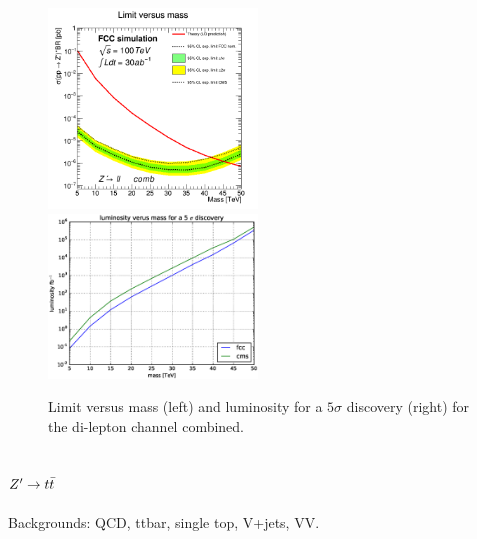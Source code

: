 \documentclass{cernrep}
\begin{document}
\begin{figure}[!htb]\centering
\includegraphics[width=0.495\textwidth]{Fig/lim_Zprime_ll_fcc_cms.png}
\includegraphics[width=0.495\textwidth]{Fig/DiscoveryPotential_ll.eps}
\caption{Limit versus mass (left) and luminosity for a $5\sigma$ discovery (right) for the
 di-lepton channel combined.}
\label{fig:zpll_lim}
\end{figure}

\clearpage
\newpage

\subsection{$Z^{\prime} \rightarrow t\bar{t}$}
\label{subsec:Zptt}

Backgrounds: QCD, ttbar, single top, V+jets, VV. 
\end{document}
